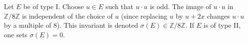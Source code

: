 Let $E$ be of type I. Choose $u \in E$ such that $u \cdot u$ is odd. The image of $u \cdot u$ in $\mathbb{Z}/8\mathbb{Z}$ is independent of the choice of $u$ (since replacing $u$ by $u+2x$ changes $u \cdot u$ by a multiple of 8). This invariant is denoted $\sigma(E) \in \mathbb{Z}/8\mathbb{Z}$. If $E$ is of type II, one sets $\sigma(E) = 0$.
